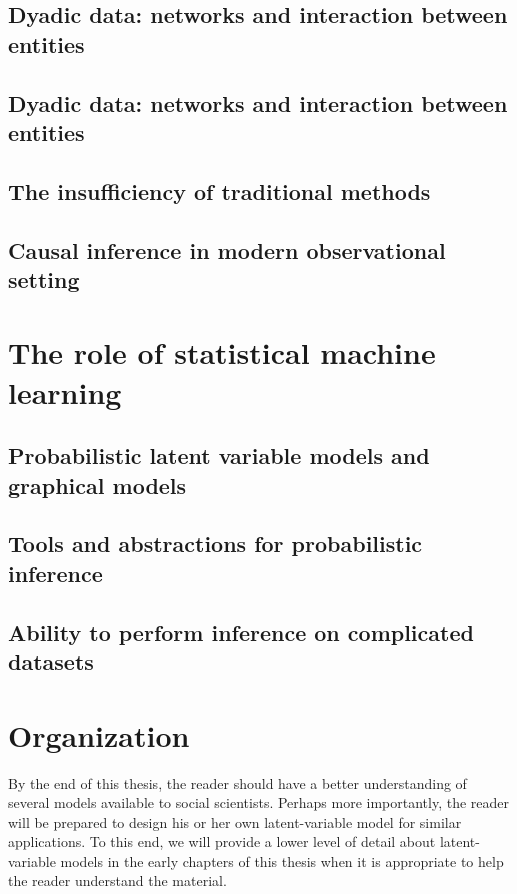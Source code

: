 \subsection*{Dyadic data: networks and interaction between entities}

\subsection*{Dyadic data: networks and interaction between entities}

\subsection*{The insufficiency of traditional methods}

\subsection*{Causal inference in modern observational setting}

\section*{The role of statistical machine learning}

\subsection*{Probabilistic latent variable models and graphical models}
\cite{pearl:1985}

\subsection*{Tools and abstractions for probabilistic inference}

\subsection*{Ability to perform inference on complicated datasets}

\section{Organization}

By the end of this thesis, the reader should have a better
understanding of several models available to social scientists.
Perhaps more importantly, the reader will be prepared to design his or
her own latent-variable model for similar applications. To this end,
we will provide a lower level of detail about latent-variable models
in the early chapters of this thesis when it is appropriate to help
the reader understand the material.


